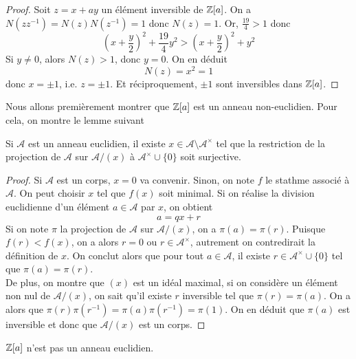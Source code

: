 \documentclass[../main.tex]{subfiles}
\begin{document}
\begin{proof} Soit \(z = x+ay\) un élément inversible de \(\mathbb{Z}[a]\). On a \(N(zz^{-1})= N(z)N(z^{-1}) = 1\) donc 
    \(N(z) = 1\). Or, \(\frac{19}{4} > 1\) donc
    \begin{equation}
        \left(x+\frac{y}{2}\right)^2+ \frac{19}{4}y^2 >\left(x+\frac{y}{2}\right)^2+y^2
    \end{equation}
    Si \(y\neq 0\), alors \(N(z) > 1\), donc \(y = 0\). On en déduit
    \begin{equation}
        N(z) = x^2 = 1
    \end{equation}
    donc \(x = \pm 1\), i.e. \(z = \pm 1\). Et réciproquement, \(\pm 1\) sont inversibles dans \(\mathbb{Z}[a]\).
\end{proof}
Nous allons premièrement montrer que \(\mathbb{Z}[a]\) est un anneau non-euclidien. Pour cela, on montre le lemme suivant
\begin{lemma}
    Si \(\mathcal{A}\) est un anneau euclidien, il existe \(x\in\mathcal{A}\setminus\mathcal{A}^\times\)
    tel que la restriction de la projection de \(\mathcal{A}\) sur \(\mathcal{A}/(x)\) à \(\mathcal{A}^\times\cup \{0\}\) soit surjective. 
\end{lemma}
\begin{proof}
    Si \(\mathcal{A}\) est un corps, \(x=0\) va convenir. Sinon, on note \(f\) le stathme associé à \(\mathcal{A}\). On peut choisir \(x\) tel que \(f(x)\) soit minimal.
    Si on réalise la division euclidienne d'un élément \(a\in \mathcal{A}\) par \(x\), on obtient 
    \begin{equation}
        a = qx + r
    \end{equation}
    Si on note \(\pi\) la projection de \(\mathcal{A}\) sur \(\mathcal{A}/(x)\), on a \(\pi(a) = \pi(r)\). Puisque \(f(r) <f(x)\), on a alors \(r = 0\) ou \(r\in \mathcal{A}^\times\), 
    autrement on contredirait la définition de \(x\). On conclut alors que pour tout \(a\in\mathcal{A}\), il existe \(r\in \mathcal{A}^\times \cup \{0\}\) tel que \(\pi(a) = \pi(r)\).\\

    De plus, on montre que \((x)\) est un idéal maximal, si on considère un élément non nul de \(\mathcal{A}/(x)\), on sait qu'il existe \(r\) inversible tel que \(\pi(r) = \pi(a)\). On a alors que 
    \(\pi(r)\pi(r^{-1}) = \pi(a)\pi(r^{-1}) = \pi(1)\). On en déduit que \(\pi(a)\) est inversible et donc que \(\mathcal{A}/(x)\) est un corps.
\end{proof}
\begin{proposition} \(\mathbb{Z}[a]\) n'est pas un anneau euclidien.
\end{proposition}
\end{document}
